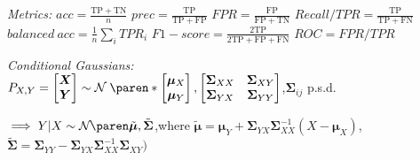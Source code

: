 \iffalse
    \emph{Euler-Lagrange:}
    Find extrema of functional $\mathcal F[f] = \int G(x, f(x), f’(x)) \diff x$,
    thus $\pderiv{\mathcal F}{f} \overset!= 0$.
    \\
    If $G$ is twice diff'able, then
    \\
    $\pderiv{\mathcal F}{f} = \pderiv{G}{f(x)} - \deriv{}{x} \paren*{ \pderiv{G}{f'(x)} } \overset{(\ast)}= \pderiv{G}{f(x)}$.
    \\
    $(\ast)$ : when $G$ does not depend on $f'$.
\fi


\emph{Metrics:}
$\mathit{acc} = \frac{\mathrm{TP} + \mathrm{TN}}{n}$
$\mathit{prec} = \frac{\mathrm{TP}}{\mathrm{TP} + \mathrm{FP}}$
$\mathit{FPR} = \frac{\mathrm{FP}}{\mathrm{FP} + \mathrm{TN}}$
$\mathit{Recall/TPR} = \frac{\mathrm{TP}}{\mathrm{TP} + \mathrm{FN}}$
$\mathit{balanced\:acc} = \frac1n \sum_i \mathit{TPR}_i$
$\mathit{F1\!-\!score} = \frac{2 \mathrm{TP}}{2 \mathrm{TP} + \mathrm{FP} + \mathrm{FN}}$
$\mathit{ROC} = \mathit{FPR} / \mathit{TPR}$


\emph{Conditional Gaussians:}\\
$P_{X,Y} = \begin{bmatrix} \bm X \\ \bm Y \end{bmatrix} \sim
\Gauss*[~]{
    \begin{bmatrix} \bm\mu_X \\ \bm\mu_Y \end{bmatrix} ,
    \begin{bmatrix} \bm\Sigma_{XX} & \bm\Sigma_{XY} \\ \bm\Sigma_{YX} & \bm\Sigma_{YY} \end{bmatrix}
}$,\enspace $\bm\Sigma_{ij}$ p.s.d.

\iffalse
    $\implies X\vert Y \sim \Gauss{\tilde{\bm\mu}, \tilde{\bm\Sigma}}$,\enskip where
    $\tilde{\bm\mu} = \bm\mu_X + \bm\Sigma_{XY} \bm\Sigma_{YY}^{-1} (Y - \bm\mu_Y)$,\enskip
    $\tilde{\bm\Sigma} = \bm\Sigma_{XX} - \bm\Sigma_{XY} \bm\Sigma_{YY}^{-1} \bm\Sigma_{YX})$
\fi

$\implies Y\vert X \sim \Gauss{\tilde{\bm\mu}, \tilde{\bm\Sigma}}$,\enskip where
$\tilde{\bm\mu} = \bm\mu_Y + \bm\Sigma_{YX} \bm\Sigma_{XX}^{-1} (X - \bm\mu_X)$,\enskip
$\tilde{\bm\Sigma} = \bm\Sigma_{YY} - \bm\Sigma_{YX} \bm\Sigma_{XX}^{-1} \bm\Sigma_{XY})$

